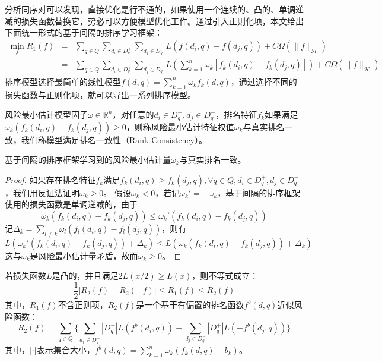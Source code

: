 分析同序对可以发现，直接优化是行不通的，如果使用一个连续的、凸的、单调递减的损失函数替换它，势必可以方便模型优化工作。通过引入正则化项，本文给出下面统一形式的基于间隔的排序学习框架：
\begin{equation}
    \begin{array}{lll}
      \min\limits_{f} R_1(f) & = & \sum\limits_{q\in Q} \sum\limits_{d_i\in D_q^+} \sum\limits_{d_j\in D_q^-} L(f(d_i,q)-f(d_j,q)) + C\Omega(\|f\|_{\mathcal{H}}) \\
       & = & \sum\limits_{q\in Q} \sum\limits_{d_i\in D_q^+} \sum\limits_{d_j\in D_q^-} L(\sum\limits_{k=1}^n \omega_k[f_k(d_i,q) - f_k(d_j,q)]) + C\Omega(\|f\|_{\mathcal{H}})
    \end{array}
\end{equation}
排序模型选择最简单的线性模型$f(d,q) = \sum\limits_{k=1}^n \omega_k f_k(d,q)$，通过选择不同的损失函数与正则化项，就可以导出一系列排序模型。

\begin{definition}[排名一致性]
风险最小估计模型因子$\omega\in \mathbb{R}^n$，对任意的$d_i\in D_q^+,d_j\in D_q^-$，排名特征$f_k$如果满足$\omega_k(f_k(d_i,q) - f_k(d_j,q))\ge 0$，则称风险最小估计特征权值$\omega_k$与真实排名一致，我们称模型满足排名一致性（Rank Consistency）。
\end{definition}

\begin{theorem}
基于间隔的排序框架学习到的风险最小估计量$\omega_k$与真实排名一致。
\end{theorem}

\begin{proof}
如果存在排名特征$f_k$满足$f_k(d_i,q)\ge f_k(d_j,q),\forall q\in Q, d_i\in D_q^+,d_j\in D_q^-$，我们用反证法证明$\omega_k \ge 0$。 假设$\omega_k<0$，若记$\omega_k' = - \omega_k$，基于间隔的排序框架使用的损失函数是单调递减的，由于
\begin{equation}
    \omega_k (f_k(d_i,q) - f_k(d_j,q)) \le \omega_k'(f_k(d_i,q) - f_k(d_j,q))
\end{equation}
记$\Delta_k = \sum\limits_{l\ne k}  \omega_l(f_l(d_i,q) - f_l(d_j,q))$，则有
\begin{equation}
    L(\omega_k'(f_k(d_i,q) - f_k(d_j,q))+\Delta_k) \le L(\omega_k (f_k(d_i,q) - f_k(d_j,q)) + \Delta_k)
\end{equation}
这与$\omega_k$是风险最小估计量矛盾，故而$\omega_k\ge 0$。
\end{proof}

\begin{theorem}
若损失函数$L$是凸的，并且满足$2L(x/2)\ge L(x)$，则不等式成立：
\begin{equation}
    \frac{1}{2} \big[R_2(f) - R_2(-f)\big] \le R_1(f) \le R_2(f)
\end{equation}
其中，$R_1(f)$不含正则项，$R_2(f)$是一个基于有偏置的排名函数$f^b(d,q)$近似风险函数：
\begin{equation}
    R_2(f) = \sum\limits_{q\in Q} \bigg\{\sum\limits_{d_i\in D_q^+} |D_q^-| L(f^b(d_i,q)) + \sum\limits_{d_j\in D_q^-} |D_q^+| L(-f^b(d_j,q))\bigg\}
\end{equation}
其中，$|\cdot|$表示集合大小，$f^b(d,q) = \sum\limits_{k=1}^n \omega_k (f_k(d,q) - b_k)$。
\end{theorem}

